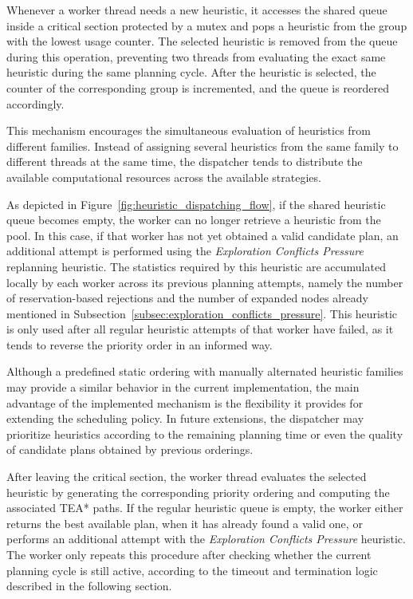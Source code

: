 Whenever a worker thread needs a new heuristic, it accesses the shared queue inside a critical
section protected by a mutex and pops a heuristic from the group with the lowest usage counter.
The selected heuristic is removed from the queue during this operation, preventing two threads from
evaluating the exact same heuristic during the same planning cycle. After the heuristic is selected,
the counter of the corresponding group is incremented, and the queue is reordered accordingly.

This mechanism encourages the simultaneous evaluation of heuristics from different families.
Instead of assigning several heuristics from the same family to different threads at the same time,
the dispatcher tends to distribute the available computational resources across the available
strategies.

As depicted in Figure~\ref{fig:heuristic_dispatching_flow}, if the shared heuristic queue becomes
empty, the worker can no longer retrieve a heuristic from the pool. In this case, if that worker has
not yet obtained a valid candidate plan, an additional attempt is performed using the
\textit{Exploration Conflicts Pressure} replanning heuristic. The statistics required by this heuristic
are accumulated locally by each worker across its previous planning attempts, namely the number
of reservation-based rejections and the number of expanded nodes already mentioned in
Subsection~\ref{subsec:exploration_conflicts_pressure}. This heuristic is only used after all regular
heuristic attempts of that worker have failed, as it tends to reverse the priority order in an informed
way.

Although a predefined static ordering with manually alternated heuristic families may provide a
similar behavior in the current implementation, the main advantage of the implemented mechanism
is the flexibility it provides for extending the scheduling policy. In future extensions, the dispatcher
may prioritize heuristics according to the remaining planning time or even the quality of candidate
plans obtained by previous orderings.

After leaving the critical section, the worker thread evaluates the selected heuristic by generating
the corresponding priority ordering and computing the associated TEA* paths. If the regular
heuristic queue is empty, the worker either returns the best available plan, when it has already
found a valid one, or performs an additional attempt with the \textit{Exploration Conflicts Pressure}
heuristic. The worker only repeats this procedure after checking whether the current planning cycle
is still active, according to the timeout and termination logic described in the following section.

